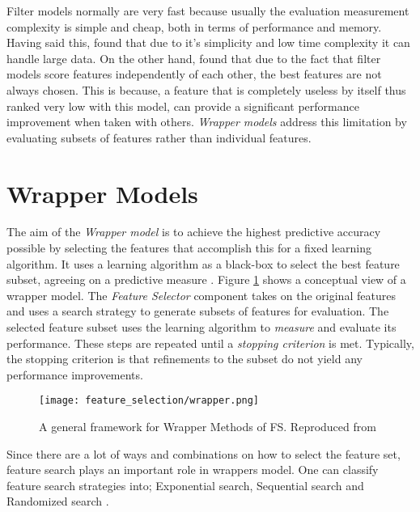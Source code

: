 Filter models normally are very fast because usually the evaluation measurement complexity is simple and cheap, both in terms of performance and memory. Having said this, \citet{garcia2015data} found that due to it's simplicity and low time complexity it can handle large data. On the other hand, \citet{guyon2003introduction} found that due to the fact that filter models score features independently of each other, the best features are not always chosen. This is because, a feature that is completely useless by itself thus ranked very low with this model, can provide a significant performance improvement when taken with others. \textit{Wrapper models} address this limitation by evaluating subsets of features rather than individual features.

\section{Wrapper Models}\label{sec:fs_filter}
The aim of the \textit{Wrapper model} is to achieve the highest predictive accuracy possible by selecting the features that accomplish this for a fixed learning algorithm. It uses a learning algorithm as a black-box to select the best feature subset, agreeing on a predictive measure \citep{kohavi1995study}. Figure \ref{fig:fs_wrapper} shows a conceptual view of a wrapper model. The \textit{Feature Selector} component takes on the original features and uses a search strategy to generate subsets of features for evaluation. The selected feature subset uses the learning algorithm to \textit{measure} and evaluate its performance. These steps are repeated until a \textit{stopping criterion} is met. Typically, the stopping criterion is that refinements to the subset do not yield any performance improvements.

\begin{figure}
  \texttt{[image: feature\_selection/wrapper.png]}
  \caption{A general framework for Wrapper Methods of FS. Reproduced from \citet{tang2014feature}}
  \label{fig:fs_wrapper}
\end{figure}

Since there are a lot of ways and combinations on how to select the feature set, feature search plays an important role in wrappers model. One can classify feature search strategies into; Exponential search, Sequential search and Randomized search \citep{de2015feature}.

